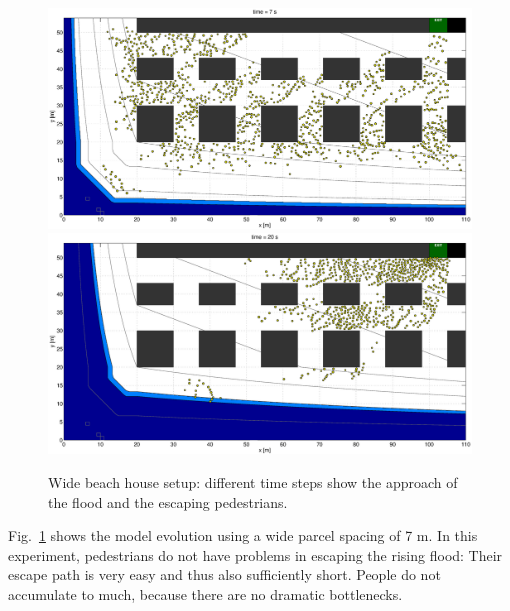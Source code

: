 \documentclass[11pt]{article}
\begin{document}
\begin{figure}
	\centering
	\includegraphics[width=1.1\textwidth]{figures/BeachEvacuationOneExitStreetWidth7_Flood0_1_000700.eps}
	\qquad
	\includegraphics[width=1.1\textwidth]{figures/BeachEvacuationOneExitStreetWidth7_Flood0_1_002000.eps}
	\caption{Wide beach house setup: different time steps show the approach of the flood and the escaping pedestrians.}
	\label{fig:beach_1}
\end{figure}

Fig.~\ref{fig:beach_1} shows the model evolution using a wide parcel spacing of 7 m. In this experiment, pedestrians do not have problems in escaping the rising flood: Their escape path is very easy and thus also sufficiently short. People do not accumulate to much, because there are no dramatic bottlenecks.
\end{document}
